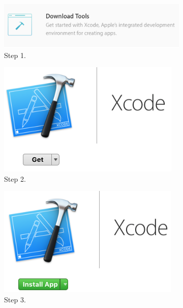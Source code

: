 \begin{figure} %
\centering
\begin{subfigure}{.5\textwidth}
  \centering
  \includegraphics[width=.9\textwidth]{graphics/xcode-setup-1.png}
  \caption{Step 1.}
\end{subfigure}%
\begin{subfigure}{.5\textwidth}
  \centering
  \includegraphics[width=.9\textwidth]{graphics/xcode-setup-2.png}
  \caption{Step 2.}
\end{subfigure}
\begin{subfigure}{.5\textwidth}
  \centering
  \includegraphics[width=.9\textwidth]{graphics/xcode-setup-3.png}
  \caption{Step 3.}
\end{subfigure}%
\begin{subfigure}{.5\textwidth}

\end{subfigure}
\end{figure}

